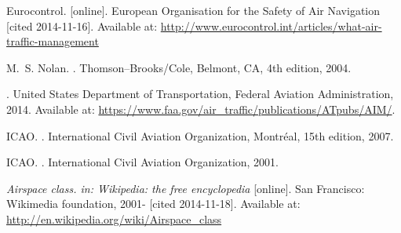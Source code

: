 \begin{thebibliography}{1}

Eurocontrol.
 [online].
\newblock European Organisation for the Safety of Air Navigation [cited 2014-11-16].
\newblock Available at: \url{http://www.eurocontrol.int/articles/what-air-traffic-management}

M.~S. Nolan.
.
\newblock Thomson--Brooks/Cole, Belmont, CA, 4th edition, 2004.

.
\newblock United States Department of Transportation, Federal Aviation Administration, 2014.
\newblock Available at: \url{https://www.faa.gov/air_traffic/publications/ATpubs/AIM/}.

ICAO.
.
\newblock International Civil Aviation Organization, Montréal, 15th edition, 2007.

ICAO.
.
\newblock International Civil Aviation Organization, 2001.


{\em Airspace class. in: Wikipedia: the free encyclopedia} [online].
\newblock San Francisco: Wikimedia foundation, 2001- [cited 2014-11-18].
\newblock Available at: \url{http://en.wikipedia.org/wiki/Airspace_class}






\end{thebibliography}
